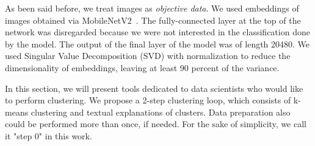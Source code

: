 \documentclass[
 twocolumn,
 hf,
]{ceurart}
\begin{document}
As been said before, we treat images as \textit{objective data}.
We used embeddings of images obtained via MobileNetV2~\cite{sandler2019mobilenetv2}.
The fully-connected layer at the top of the network was disregarded because we were not interested in the classification done by the model.
The output of the final layer of the model was of length 20480.
We used Singular Value Decomposition (SVD) with normalization to reduce the dimensionality of embeddings, leaving at least 90 percent of the variance.

In this section, we will present tools dedicated to data scientists who would like to perform clustering.
We propose a 2-step clustering loop, which consists of k-means clustering and textual explanations of clusters.
Data preparation also could be performed more than once, if needed.
For the sake of simplicity, we call it "step 0" in this work.
\end{document}
